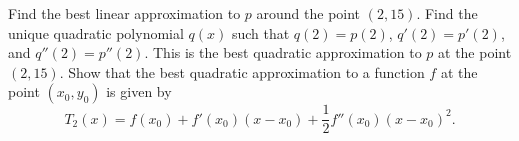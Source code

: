 \begin{questions}
\begin{parts}
      \parM Find the best linear approximation to $ p $ around the point $ (2, 15) $.
      \parS Find the unique quadratic polynomial $ q(x) $ such that $ q(2) = p(2) $, $ q'(2) = p'(2) $, and $ q''(2) = p''(2) $.
            This is the best quadratic approximation to $ p $ at the point $ (2, 15) $.
      \parO Show that the best quadratic approximation to a function $ f $ at the point $ (x_0, y_0) $ is given by
            \begin{displaymath}
              T_2(x) = f(x_0) + f'(x_0) (x - x_0) + \frac{1}{2} f''(x_0) (x - x_0)^2.
            \end{displaymath}
    \end{parts}
\end{questions}

